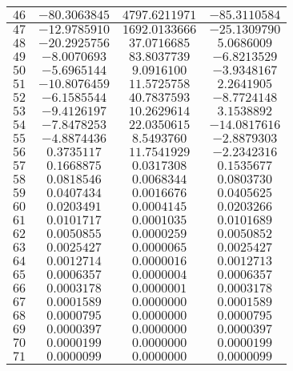 \begin{center}
\begin{longtable}{|c|c|c|c|}
		$46$ & $-80.3063845$ & $4797.6211971$ & $-85.3110584$ \\ \hline
		$47$ & $-12.9785910$ & $1692.0133666$ & $-25.1309790$ \\ \hline
		$48$ & $-20.2925756$ & $37.0716685$ & $5.0686009$ \\ \hline
		$49$ & $-8.0070693$ & $83.8037739$ & $-6.8213529$ \\ \hline
		$50$ & $-5.6965144$ & $9.0916100$ & $-3.9348167$ \\ \hline
		$51$ & $-10.8076459$ & $11.5725758$ & $2.2641905$ \\ \hline
		$52$ & $-6.1585544$ & $40.7837593$ & $-8.7724148$ \\ \hline
		$53$ & $-9.4126197$ & $10.2629614$ & $3.1538892$ \\ \hline
		$54$ & $-7.8478253$ & $22.0350615$ & $-14.0817616$ \\ \hline
		$55$ & $-4.8874436$ & $8.5493760$ & $-2.8879303$ \\ \hline
		$56$ & $0.3735117$ & $11.7541929$ & $-2.2342316$ \\ \hline
		$57$ & $0.1668875$ & $0.0317308$ & $0.1535677$ \\ \hline
		$58$ & $0.0818546$ & $0.0068344$ & $0.0803730$ \\ \hline
		$59$ & $0.0407434$ & $0.0016676$ & $0.0405625$ \\ \hline
		$60$ & $0.0203491$ & $0.0004145$ & $0.0203266$ \\ \hline
		$61$ & $0.0101717$ & $0.0001035$ & $0.0101689$ \\ \hline
		$62$ & $0.0050855$ & $0.0000259$ & $0.0050852$ \\ \hline
		$63$ & $0.0025427$ & $0.0000065$ & $0.0025427$ \\ \hline
		$64$ & $0.0012714$ & $0.0000016$ & $0.0012713$ \\ \hline
		$65$ & $0.0006357$ & $0.0000004$ & $0.0006357$ \\ \hline
		$66$ & $0.0003178$ & $0.0000001$ & $0.0003178$ \\ \hline
		$67$ & $0.0001589$ & $0.0000000$ & $0.0001589$ \\ \hline
		$68$ & $0.0000795$ & $0.0000000$ & $0.0000795$ \\ \hline
		$69$ & $0.0000397$ & $0.0000000$ & $0.0000397$ \\ \hline
		$70$ & $0.0000199$ & $0.0000000$ & $0.0000199$ \\ \hline
		$71$ & $0.0000099$ & $0.0000000$ & $0.0000099$ \\ \hline

\end{longtable}
\end{center}
